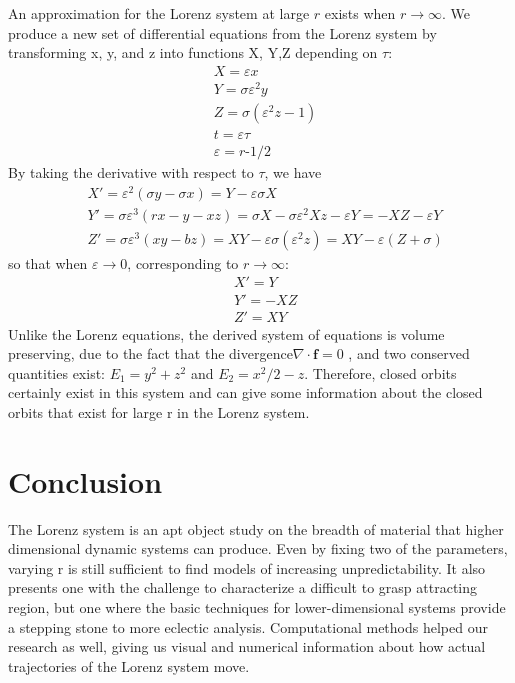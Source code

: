 \documentclass{report}
\begin{document}
  An approximation for the Lorenz system at large \(r\) exists when \(r
\rightarrow \infty \). We produce a new set of differential equations from
the Lorenz system by transforming x, y, and z into functions X, Y,Z depending
on \(\tau\):
\begin{align*}
  &X = \varepsilon x \\
  &Y = \sigma\varepsilon^2 y \\
  &Z = \sigma(\varepsilon^2z-1) \\
  &t = \varepsilon\tau \\
  &\varepsilon = r\mbox{-1/2}
\end{align*}
By taking the derivative with respect to \(\tau\), we have
\begin{align*}
  &X' = \varepsilon^2(\sigma y -\sigma x) = Y - \varepsilon\sigma X\\
  &Y' = \sigma\varepsilon^3(rx-y-xz) = \sigma X - \sigma\varepsilon^2 Xz -
\varepsilon Y = -XZ - \varepsilon Y \\
  &Z' = \sigma\varepsilon^3(xy-bz) = XY - \varepsilon\sigma(\varepsilon^2z) =
XY - \varepsilon(Z+\sigma)
\end{align*}
so that when \(\varepsilon \rightarrow 0\), corresponding to \(r \rightarrow
\infty \):
\begin{align*}
  &X' = Y \\
  &Y' = -XZ \\
  &Z' = XY
\end{align*}
Unlike the Lorenz equations, the derived system of equations is volume
preserving, due to the fact that the divergence\(\nabla\cdot\boldsymbol{f} = 0\)
, and two conserved quantities exist: \(E_1 = y^2 + z^2\) and \(E_2 = x^2/2 - z\).
Therefore, closed orbits certainly exist in this system and can give some
information about the closed orbits that exist for large r in the Lorenz
system.

\section*{Conclusion}

The Lorenz system is an apt object study on the breadth of material that higher
dimensional dynamic systems can produce. Even by fixing two of the parameters,
varying r is still sufficient to find models of increasing unpredictability.
It also presents one with the challenge to characterize a difficult to grasp
attracting region, but one where the basic techniques for lower-dimensional
systems provide a stepping stone to more eclectic analysis. Computational
methods helped our research as well, giving us visual and numerical information
about how actual trajectories of the Lorenz system move.
\end{document}
